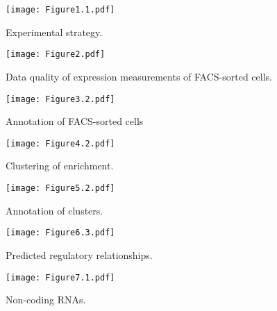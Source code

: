 \documentclass{article}
\begin{document}

\begin{figure}
\texttt{[image: Figure1.1.pdf]}
\caption{Experimental strategy.}
\end{figure}
\clearpage

\begin{figure}
\texttt{[image: Figure2.pdf]}
\caption{
Data quality of expression measurements of FACS-sorted cells.
}
\end{figure}
\clearpage

\begin{figure}
\texttt{[image: Figure3.2.pdf]}
\caption{
Annotation of FACS-sorted cells
}
\end{figure}
\clearpage

\begin{figure}
\texttt{[image: Figure4.2.pdf]}
\caption{
Clustering of enrichment.
}
\end{figure}
\clearpage


\begin{figure}
\texttt{[image: Figure5.2.pdf]}
\caption{
Annotation of clusters.
}
\end{figure}
\clearpage


\begin{figure}
\texttt{[image: Figure6.3.pdf]}
\caption{
Predicted regulatory relationships.
}
\end{figure}
\clearpage


\begin{figure}
\texttt{[image: Figure7.1.pdf]}
\caption{
Non-coding RNAs.
}
\end{figure}
\clearpage
\end{document}
